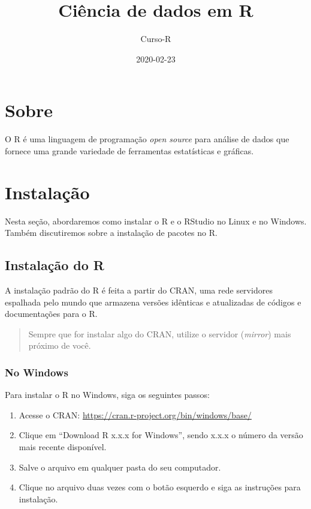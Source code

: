 \documentclass[]{book}
\title{Ciência de dados em R}
\author{Curso-R}
\date{2020-02-23}
\begin{document}
\maketitle

{
\setcounter{tocdepth}{1}
\tableofcontents
}
\hypertarget{sobre}{%
\chapter*{Sobre}\label{sobre}}

O R é uma linguagem de programação \emph{open source} para análise de dados que fornece uma grande variedade de ferramentas estatísticas e gráficas.

\hypertarget{instalauxe7uxe3o}{%
\chapter{Instalação}\label{instalauxe7uxe3o}}

Nesta seção, abordaremos como instalar o R e o RStudio no Linux e no Windows. Também discutiremos sobre a instalação de pacotes no R.

\hypertarget{instalauxe7uxe3o-do-r}{%
\section{Instalação do R}\label{instalauxe7uxe3o-do-r}}

A instalação padrão do R é feita a partir do CRAN, uma rede servidores espalhada pelo mundo que armazena versões idênticas e atualizadas de códigos e documentações para o R.

\begin{quote}
Sempre que for instalar algo do CRAN, utilize o servidor (\emph{mirror}) mais próximo de você.
\end{quote}

\hypertarget{no-windows}{%
\subsection{No Windows}\label{no-windows}}

Para instalar o R no Windows, siga os seguintes passos:

\begin{enumerate}
\def\labelenumi{\arabic{enumi}.}
\item
  Acesse o CRAN: \url{https://cran.r-project.org/bin/windows/base/}
\item
  Clique em ``Download R x.x.x for Windows'', sendo x.x.x o número da versão mais recente disponível.
\item
  Salve o arquivo em qualquer pasta do seu computador.
\item
  Clique no arquivo duas vezes com o botão esquerdo e siga as instruções para instalação.
\end{enumerate}
\end{document}
